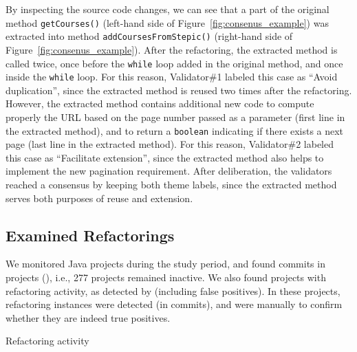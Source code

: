 By inspecting the source code changes, we can see that a part of the original method \texttt{getCourses()} (left-hand side of Figure~\ref{fig:consenus_example})
was extracted into method \texttt{addCoursesFromStepic()} (right-hand side of Figure~\ref{fig:consenus_example}).
After the refactoring, the extracted method is called twice, once before the \texttt{while} loop added in the original method, and once inside the \texttt{while} loop.
For this reason, Validator\#1 labeled this case as ``Avoid duplication'', since the extracted method is reused two times after the refactoring.
However, the extracted method contains additional new code to compute properly the URL based on the page number passed as a parameter (first line in the extracted method),
and to return a \texttt{boolean} indicating if there exists a next page (last line in the extracted method).
For this reason, Validator\#2 labeled this case as ``Facilitate extension'', since the extracted method also helps to implement the new pagination requirement.
After deliberation, the validators reached a consensus by keeping both theme labels, since the extracted method serves both purposes of reuse and extension.






\subsection{Examined Refactorings}
\label{study2:examined-data}

We monitored \totalProjects Java projects during the study period, and found commits in \activeProjects projects (\activeProjectsPercentage), i.e., 277 projects remained inactive.
We also found  projects with refactoring activity, as detected by \toolName (including false positives).
In these projects, \detectedRefactorings refactoring instances were detected (in \commitsWithDetectedRefactoring commits), and were manually to confirm whether they are indeed true positives.
 
\begin{table}[ht]
\centering
\renewcommand{\arraystretch}{1.2}
\caption{Refactoring activity}
\label{TabRefactoringActivity}

\end{table}

